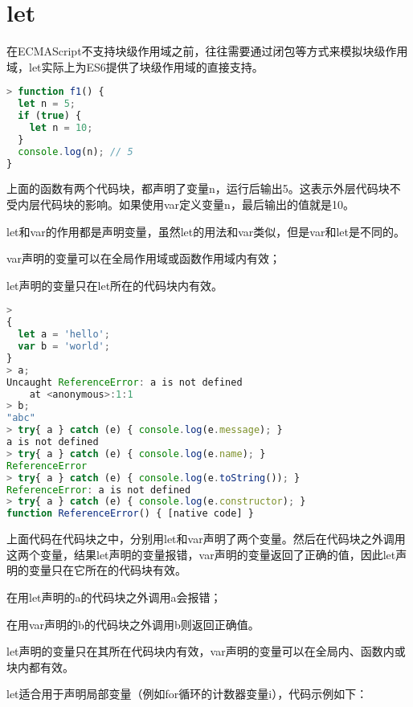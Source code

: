 \section{let}


在ECMAScript不支持块级作用域之前，往往需要通过闭包等方式来模拟块级作用域，let实际上为ES6提供了块级作用域的直接支持。

\begin{lstlisting}[language=JavaScript]
> function f1() {
  let n = 5;
  if (true) {
    let n = 10;
  }
  console.log(n); // 5
}
\end{lstlisting}

上面的函数有两个代码块，都声明了变量n，运行后输出5。这表示外层代码块不受内层代码块的影响。如果使用var定义变量n，最后输出的值就是10。


let和var的作用都是声明变量，虽然let的用法和var类似，但是var和let是不同的。

\begin{compactitem}
\item var声明的变量可以在全局作用域或函数作用域内有效；
\item let声明的变量只在let所在的代码块内有效。
\end{compactitem}


\begin{lstlisting}[language=JavaScript]
> 
{
  let a = 'hello';  
  var b = 'world';
}
> a;
Uncaught ReferenceError: a is not defined
    at <anonymous>:1:1
> b;
"abc"
> try{ a } catch (e) { console.log(e.message); }
a is not defined
> try{ a } catch (e) { console.log(e.name); }
ReferenceError
> try{ a } catch (e) { console.log(e.toString()); }
ReferenceError: a is not defined
> try{ a } catch (e) { console.log(e.constructor); }
function ReferenceError() { [native code] }
\end{lstlisting}

上面代码在代码块之中，分别用let和var声明了两个变量。然后在代码块之外调用这两个变量，结果let声明的变量报错，var声明的变量返回了正确的值，因此let声明的变量只在它所在的代码块有效。

\begin{compactitem}
\item 在用let声明的a的代码块之外调用a会报错；
\item 在用var声明的b的代码块之外调用b则返回正确值。
\end{compactitem}

let声明的变量只在其所在代码块内有效，var声明的变量可以在全局内、函数内或块内都有效。

let适合用于声明局部变量（例如for循环的计数器变量i），代码示例如下：


